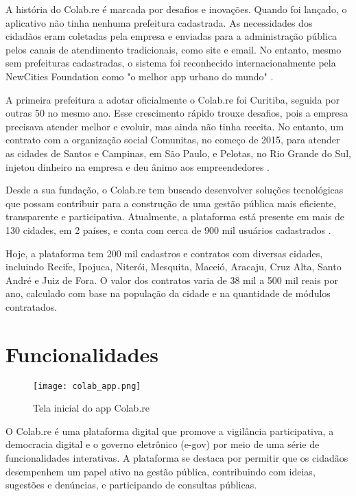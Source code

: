 A história do Colab.re é marcada por desafios e inovações. Quando foi lançado, o aplicativo não tinha nenhuma prefeitura cadastrada. As necessidades dos cidadãos eram coletadas pela empresa e enviadas para a administração pública pelos canais de atendimento tradicionais, como site e email. No entanto, mesmo sem prefeituras cadastradas, o sistema foi reconhecido internacionalmente pela NewCities Foundation como "o melhor app urbano do mundo" \cite{2023_Colab_PAGE}.

A primeira prefeitura a adotar oficialmente o Colab.re foi Curitiba, seguida por outras 50 no mesmo ano. Esse crescimento rápido trouxe desafios, pois a empresa precisava atender melhor e evoluir, mas ainda não tinha receita. No entanto, um contrato com a organização social Comunitas, no começo de 2015, para atender as cidades de Santos e Campinas, em São Paulo, e Pelotas, no Rio Grande do Sul, injetou dinheiro na empresa e deu ânimo aos empreendedores \cite{2023_Colab_PAGE}.

Desde a sua fundação, o Colab.re tem buscado desenvolver soluções tecnológicas que possam contribuir para a construção de uma gestão pública mais eficiente, transparente e participativa. Atualmente, a plataforma está presente em mais de 130 cidades, em 2 países, e conta com cerca de 900 mil usuários cadastrados \cite{2023_Colab_PAGE}.

Hoje, a plataforma tem 200 mil cadastros e contratos com diversas cidades, incluindo Recife, Ipojuca, Niterói, Mesquita, Maceió, Aracaju, Cruz Alta, Santo André e Juiz de Fora. O valor dos contratos varia de 38 mil a 500 mil reais por ano, calculado com base na população da cidade e na quantidade de módulos contratados.

\section*{Funcionalidades}

\begin{figure}[!htb]
	\caption{Tela inicial do app Colab.re}
	\label{fig:colab_app}
	\centering
	\texttt{[image: colab\_app.png]}
\end{figure}

O Colab.re é uma plataforma digital que promove a vigilância participativa, a democracia digital e o governo eletrônico (e-gov) por meio de uma série de funcionalidades interativas. A plataforma se destaca por permitir que os cidadãos desempenhem um papel ativo na gestão pública, contribuindo com ideias, sugestões e denúncias, e participando de consultas públicas.

